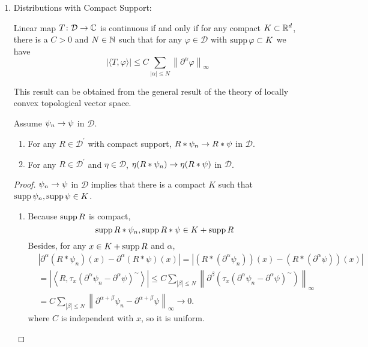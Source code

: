 \begin{enumerate}[label=\arabic*.]
	\item Distributions with Compact Support: 
	\begin{prop}
		Linear map $T \colon \mathcal{D} \rightarrow \mathbb{C}$ is continuous if and only if for any compact $K \subset \mathbb{R}^d$, there is a $C > 0$ and $N \in \mathbb{N}$ such that for any $\varphi \in \mathcal{D}$ with $\operatorname{supp} \varphi \subset K$ we have
		\begin{equation*}
			|\langle T, \varphi\rangle| \leq C \sum_{|\alpha| \leq N}\left\|\partial^\alpha \varphi\right\|_{\infty}
		\end{equation*}
	\end{prop}
	\begin{rmk}
		This result can be obtained from the general result of the theory of locally convex topological vector space.
	\end{rmk}

	\begin{lem}
		Assume $\psi_n \rightarrow \psi$ in $\mathcal{D}$.
		\begin{enumerate}[label=(\arabic{*})]
			\item For any $R \in \mathcal{D}^\prime$ with compact support, $R*\psi_n \rightarrow R*\psi$ in $\mathcal{D}$.
			\item For any $R \in \mathcal{D}^\prime$ and $\eta \in \mathcal{D}$, $\eta(R*\psi_n)\rightarrow \eta(R*\psi)$ in $\mathcal{D}$.
		\end{enumerate}
	\end{lem}
	\begin{proof}
		$\psi_n \rightarrow \psi$ in $\mathcal{D}$ implies that there is a compact $K$ such that $\operatorname{supp} \psi_n, \operatorname{supp} \psi \in K$.
		\begin{enumerate}[label=(\arabic{*})]
			\item Because $\operatorname{supp} R$ is compact, 
			\begin{equation*}
				\operatorname{supp} R*\psi_n, \operatorname{supp} R*\psi \in K + \operatorname{supp} R
			\end{equation*}
			Besides, for any $x \in K + \operatorname{supp} R$ and $\alpha$,
			\begin{equation*}
				\begin{aligned}
					& \left|\partial^\alpha\left(R * \psi_n\right)(x)-\partial^\alpha(R * \psi)(x)\right|=\left|\left(R *\left(\partial^\alpha \psi_n\right)\right)(x)-\left(R *\left(\partial^\alpha \psi\right)\right)(x)\right| \\
					& =\left|\left\langle R, \tau_x\left(\partial^\alpha \psi_n-\partial^\alpha \psi\right)^{\sim}\right\rangle\right| \leq C \sum_{|\beta| \leq N}\left\|\partial^\beta\left(\tau_x\left(\partial^\alpha \psi_n-\partial^\alpha \psi\right)^{\sim}\right)\right\|_{\infty} \\
					& =C \sum_{|\beta| \leq N}\left\|\partial^{\alpha+\beta} \psi_n-\partial^{\alpha+\beta} \psi\right\|_{\infty} \rightarrow 0 .
				\end{aligned}
			\end{equation*}
			where $C$ is independent with $x$, so it is uniform. 


\end{enumerate}
\end{proof}
\end{enumerate}
